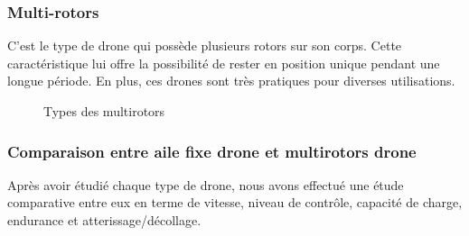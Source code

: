 	\subsubsection{Multi-rotors}
	C'est le type de drone qui possède plusieurs rotors sur son corps. Cette caractéristique lui offre la possibilité de rester en position unique pendant une longue période. En plus, ces drones sont très pratiques pour diverses utilisations.
	\begin {figure}[H] 
	\begin{center} 
		\centering
			\pagestyle{fancy}
		\hspace*{-0.7cm}
		
	\end{center}
	
	\caption{Types des multirotors}
	\end{figure}
	\subsubsection{Comparaison entre aile fixe drone et multirotors drone}
	Après avoir étudié chaque type de drone, nous avons effectué une étude comparative entre eux en terme de vitesse, niveau de contrôle, capacité de charge, endurance et atterissage/décollage.
	

